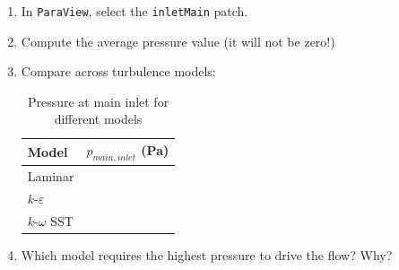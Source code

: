 \documentclass[
parskip=half,      %
DIV=12,            %
headings=normal,   %
fontsize=11pt,     %
english            %
]{scrartcl}
\begin{document}
	\begin{enumerate}
		\item In \texttt{ParaView}, select the \texttt{inletMain} patch.
		\item Compute the average pressure value (it will not be zero!)
		\item Compare across turbulence models:
		
		\begin{table}[h]
			\centering
			\begin{tabular}{|l|c|}
				\hline
				\textbf{Model} & \textbf{$p_{main,inlet}$ (Pa)} \\
				\hline
				Laminar & \\
				$k$-$\varepsilon$ & \\
				$k$-$\omega$ SST & \\
				\hline
			\end{tabular}
			\caption{Pressure at main inlet for different models}
			\label{tab:pressure_main}
		\end{table}
		
		\item Which model requires the highest pressure to drive the flow? Why?
	\end{enumerate}
	
\end{document}
